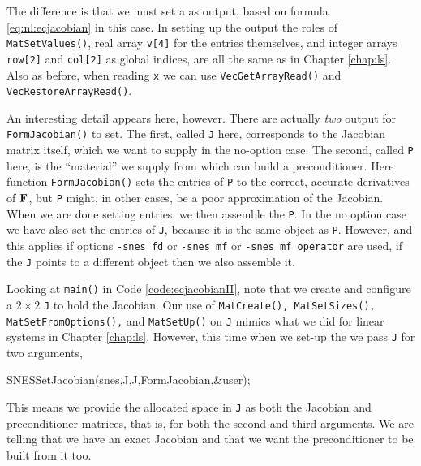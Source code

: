 The difference is that we must set a \pMat as output, based on formula \eqref{eq:nl:ecjacobian} in this case.  In setting up the output \pMat the roles of \texttt{MatSetValues()}, real array \texttt{v[4]} for the entries themselves, and integer arrays \texttt{row[2]} and \texttt{col[2]} as global indices, are all the same as in Chapter \ref{chap:ls}.  Also as before, when reading \texttt{x} we can use \texttt{VecGetArrayRead()} and \texttt{VecRestoreArrayRead()}.


An interesting detail appears here, however.  There are actually \emph{two} output \pMats for \texttt{FormJacobian()} to set.  The first, called \texttt{J} here, corresponds to the Jacobian matrix itself, which we want to supply in the no-option case.  The second, called \texttt{P} here, is the ``material'' we supply from which \PETSc can build a preconditioner.  Here function \texttt{FormJacobian()} sets the entries of \pMat \texttt{P} to the correct, accurate derivatives of $\mathbf{F}$, but \texttt{P}  might, in other cases, be a poor approximation of the Jacobian.  When we are done setting entries, we then assemble the \pMat \texttt{P}.  In the no option case we have also set the entries of \pMat \texttt{J}, because it is the same \pMat object as \texttt{P}.  However, and this applies if options \texttt{-snes\_fd} or \texttt{-snes\_mf} or \texttt{-snes\_mf\_operator} are used, if the \pMat \texttt{J} points to a different object then we also assemble it.

Looking at \texttt{main()} in Code \ref{code:ecjacobianII}, note that we create and configure a $2\times 2$ \pMat \texttt{J} to hold the Jacobian.  Our use of \texttt{MatCreate(), MatSetSizes(), MatSetFromOptions(),} and \texttt{MatSetUp()} on \texttt{J} mimics what we did for linear systems in Chapter \ref{chap:ls}.  However, this time when we set-up the \pSNES we pass \texttt{J} for two arguments,
\begin{code}
SNESSetJacobian(snes,J,J,FormJacobian,&user);
\end{code}
This means we provide the allocated space in \texttt{J} as both the Jacobian and preconditioner matrices, that is, for both the second and third \pMat arguments.  We are telling \PETSc that we have an exact Jacobian and that we want the preconditioner to be built from it too.

